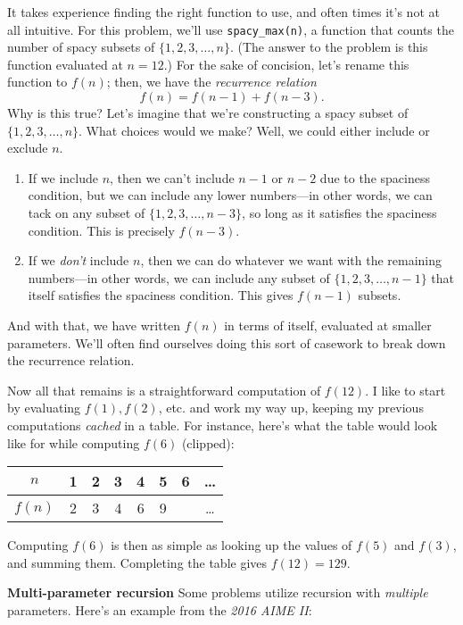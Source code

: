\documentclass{article}
\begin{document}
\begin{multicols}{3}
It takes experience finding the right function to use, and often times it's not at all intuitive. For this problem, we'll use \texttt{spacy\_max(n)}, a function that counts the number of spacy subsets of $\{1, 2, 3, \dots, n\}$. (The answer to the problem is this function evaluated at $n=12$.) For the sake of concision, let's rename this function to $f(n)$; then, we have the \textit{recurrence relation}
$$f(n) = f(n - 1) + f(n - 3).$$Why is this true? Let's imagine that we're constructing a spacy subset of $\{1, 2, 3, \dots, n\}$. What choices would we make? Well, we could either include or exclude $n$.
\begin{enumerate}
\item If we include $n$, then we can't include $n - 1$ or $n - 2$ due to the spaciness condition, but we can include any lower numbers—in other words, we can tack on any subset of $\{1, 2, 3, \dots, n - 3\}$, so long as it satisfies the spaciness condition. This is precisely $f(n - 3)$.
\item If we \textit{don't} include $n$, then we can do whatever we want with the remaining numbers—in other words, we can include any subset of $\{1, 2, 3, \dots, n - 1\}$ that itself satisfies the spaciness condition. This gives $f(n - 1)$ subsets.
\end{enumerate}
And with that, we have written $f(n)$ in terms of itself, evaluated at smaller parameters. We'll often find ourselves doing this sort of casework to break down the recurrence relation.

Now all that remains is a straightforward computation of $f(12)$. I like to start by evaluating $f(1), f(2)$, etc. and work my way up, keeping my previous computations \textit{cached} in a table. For instance, here's what the table would look like for while computing $f(6)$ (clipped):
\begin{table}[h!]
    \centering
    \begin{tabular}{c|c|c|c|c|c|c|c}
         $n$ & 1 & 2 & 3 & 4 & 5 & 6 & \dots \\\hline
         $f(n)$ & 2 & 3 & 4 & 6 & 9 & & \dots
    \end{tabular}
\end{table}
Computing $f(6)$ is then as simple as looking up the values of $f(5)$ and $f(3)$, and summing them. Completing the table gives $f(12) = 129$.

\textbf{Multi-parameter recursion}
Some problems utilize recursion with \textit{multiple} parameters. Here's an example from the \textit{2016 AIME II}:


\end{multicols}
\end{document}
